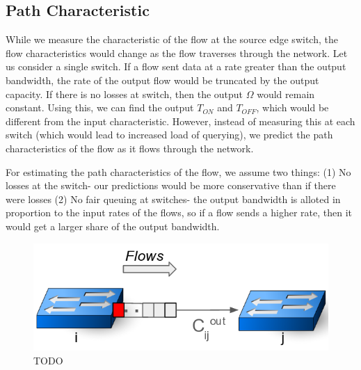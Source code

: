 \subsection{Path Characteristic}
While we measure the characteristic of the flow at the source edge switch, 
the flow characteristics would change as the flow traverses through the network.
Let us consider a single switch. If a flow sent data at a rate greater than the output
bandwidth, the rate of the output flow would be truncated by the output capacity. 
If there is no losses at switch, then the output $\Omega$ would remain
constant. Using this, we can find the output $T_{ON}$ and $T_{OFF}$, which
would be different from the input characteristic. However, instead of measuring 
this at each switch (which would lead to increased load of querying), we predict
the path characteristics of the flow as it flows through the network. 

For estimating the path characteristics of the flow, we assume two things: (1) No losses
at the switch- our predictions would be more conservative than if there were losses
(2) No fair queuing at switches- the output bandwidth is alloted in proportion to the input
rates of the flows, so if a flow sends a higher rate, then it would get a larger share of the output 
bandwidth. 

\begin{figure}[H]
	\centering
	\includegraphics[width=\columnwidth]{switchmodel.png}
	\caption{TODO}
	\label{fig:switchmodel}
\end{figure}


